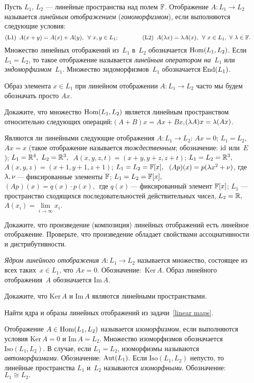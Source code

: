 \documentclass[a4paper,12pt,fleqn]{article}
\renewcommand{\ker}{\mathrm{Ker\,}}
\newcommand{\im}{\mathrm{Im\,}}
\newcommand{\Iso}{\mathrm{Iso}}
\begin{document}

Пусть $L_1$, $L_2$ --- линейные пространства над полем $\mathbb{F}$. Отображение $A\colon L_1\to L_2$ называется \emph{линейным отображением} (\emph{гомоморфизмом}), если выполняются следующие условия:
$$(\mbox{L1})\,\,\,A(x+y)=A(x)+A(y),\,\,\,\forall\,\,x,y\in L_1;\qquad\qquad (\mbox{L2})\,\,\,A(\lambda x)=\lambda A(x),\,\,\,\forall\,\,x\in L_1,\,\,\forall\,\,\lambda\in\mathbb{F}.$$
Множество линейных отображений из~$L_1$ в~$L_2$ обозначается $\operatorname{Hom}(L_1,L_2)$. Если {$L_1=L_2$}, то такое отображение называется \emph{линейным оператором на~$L_1$} или \emph{эндоморфизмом~$L_1$}. Множество эндоморфизмов~$L_1$ обозначается $\operatorname{End}(L_1)$.

Образ элемента $x\in L_1$ при линейном отображении $A\colon L_1\to L_2$ часто мы будем обозначать просто $Ax$.

Докажите, что множество $\operatorname{Hom} (L_1,L_2)$ является линейным пространством относительно
следующих операций:\quad $(A+B)x=Ax+Bx$,\quad $(\lambda A)x=\lambda (Ax)$.

 \label{linear maps}
Являются ли линейными следующие отображения $A\colon L_1\to L_2$:
 $Ax=0$;
 $L_1=L_2,\,\,$ $Ax=x$ (такое отображение называется \emph{тождественным};
обозначение: $\operatorname{id}$ или~$E$);
 $L_1=\mathbb{R}^4,$ $L_2=\mathbb{R}^3,\,\,$ $A(x,y,z,t)=(x+y,y+z,z+t)$;
 $L_1=L_2=\mathbb{R}^3,\,\,$ $A(x,y,z)=(x+1,y+1,z+1)$;
 $L_1=L_2=\mathbb{F}[x],\,\,$ $(Ap)(x)=p(\lambda x^2+\nu)$,\,\,где $\lambda,\nu$\,---
фиксированные элементы $\mathbb{F}$;
 $L_1=L_2=\mathbb{F}[x],\,\,$ $(Ap)(x)=q(x)\cdot p(x)$,\,\, где $q(x)$\,--- фиксированный элемент $\mathbb{F}[x]$;
 $L_1$ --- пространство сходящихся последовательностей действительных
чисел, $L_2=\mathbb{R},\,\,$ $A(x_i)=\lim\limits_{i\to\infty}x_i$.

Докажите, что произведение (композиция) линейных отображений есть линейное отображение. Проверьте, что произведение обладает свойствами ассоциативности и дистрибутивности.

\emph{Ядром линейного отображения} $A\colon L_1\to L_2$ называется множество, состоящее из всех таких~$x\in L_1$, что $Ax=0$. Обозначение:~$\ker A$. Образ линейного отображения~$A$ обозначается $\im A$.

Докажите, что $\ker A$ и $\im A$ являются линейными пространствами.

Найти ядра и образы линейных отображений из задачи~\ref{linear maps}.

Отображение $A\in\operatorname{Hom}(L_1,L_2)$ называется \emph{изоморфизмом}, если выполняются условия $\ker A=0$ и $\im A=L_2$. Множество изоморфизмов обозначается $\Iso(L_1,L_2)$. В случае, если $L_1=L_2$, изоморфизмы называются \emph{автоморфизмами.} Обозначение: $\operatorname{Aut}(L_1)$. Если $\Iso(L_1,L_2)$ непусто, то линейные пространства $L_1$ и~$L_2$ называются \emph{изоморфными}. Обозначение: $L_1\cong L_2.$
\end{document}
